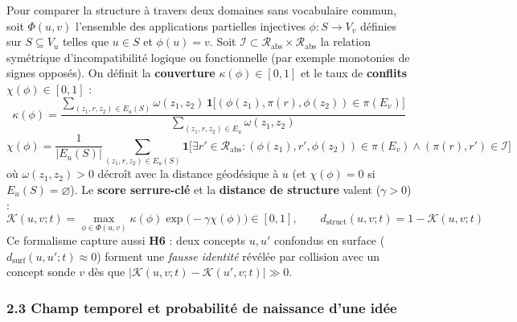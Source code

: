 \documentclass[a4paper,11pt]{article}
\begin{document}
Pour comparer la structure à travers deux domaines sans vocabulaire
commun, soit \(\Phi(u,v)\) l'ensemble des applications partielles
injectives \(\phi : S \to V_v\) définies sur \(S \subseteq V_u\) telles
que \(u \in S\) et \(\phi(u) = v\). Soit
\(\mathcal{I} \subset \mathcal{R}_{\text{abs}} \times \mathcal{R}_{\text{abs}}\)
la relation symétrique d'incompatibilité logique ou fonctionnelle (par
exemple monotonies de signes opposés). On définit la \textbf{couverture}
\(\kappa(\phi) \in [0,1]\) et le taux de \textbf{conflits}
\(\chi(\phi) \in [0,1]\) :
\[\kappa(\phi) = \frac{\sum_{(z_1, r, z_2) \in E_u(S)} \omega(z_1, z_2)\,\mathbf{1}\!\big[(\phi(z_1), \pi(r), \phi(z_2)) \in \pi(E_v)\big]}{\sum_{(z_1, r, z_2) \in E_u} \omega(z_1, z_2)}\]
\[\chi(\phi) = \frac{1}{|E_u(S)|} \sum_{(z_1, r, z_2) \in E_u(S)} \mathbf{1}\!\big[\exists r' \in \mathcal{R}_{\text{abs}} : (\phi(z_1), r', \phi(z_2)) \in \pi(E_v) \land (\pi(r), r') \in \mathcal{I}\big]\]
où \(\omega(z_1, z_2) > 0\) décroît avec la distance géodésique à \(u\)
(et \(\chi(\phi)=0\) si \(E_u(S)=\varnothing\)). Le \textbf{score
serrure-clé} et la \textbf{distance de structure} valent
(\(\gamma > 0\)) :
\[\mathcal{K}(u, v; t) = \max_{\phi \in \Phi(u,v)} \kappa(\phi)\exp\!\big(-\gamma \chi(\phi)\big) \in [0, 1], \qquad d_{\text{struct}}(u, v; t) = 1 - \mathcal{K}(u, v; t)\]
Ce formalisme capture aussi \textbf{H6} : deux concepts \(u, u'\)
confondus en surface (\(d_{\text{surf}}(u, u'; t) \approx 0\)) forment
une \emph{fausse identité} révélée par collision avec un concept sonde
\(v\) dès que \(|\mathcal{K}(u, v; t) - \mathcal{K}(u', v; t)| \gg 0\).

\subsubsection*{2.3 Champ temporel et probabilité de naissance d'une
idée}
\end{document}
